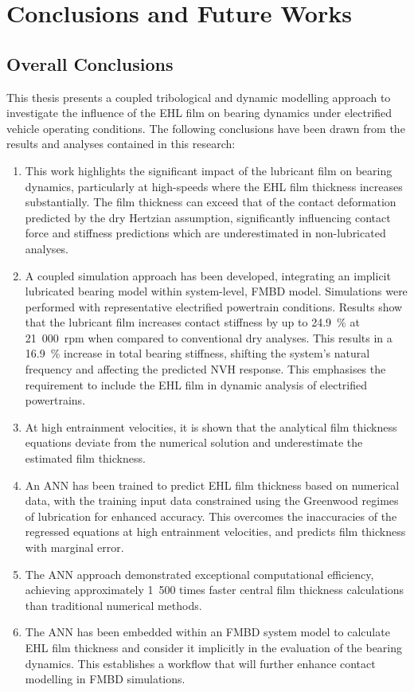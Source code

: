 \chapter{Conclusions and Future Works}
\label{Conclusions}

\section{Overall Conclusions}

This thesis presents a coupled tribological and dynamic modelling approach to investigate the influence of the EHL film on bearing dynamics under electrified vehicle operating conditions. The following conclusions have been drawn from the results and analyses contained in this research:

\begin{enumerate}
	\item This work highlights the significant impact of the lubricant film on bearing dynamics, particularly at high-speeds where the EHL film thickness increases substantially. The film thickness can exceed that of the contact deformation predicted by the dry Hertzian assumption, significantly influencing contact force and stiffness predictions which are underestimated in non-lubricated analyses.
	\item A coupled simulation approach has been developed, integrating an implicit lubricated bearing model within system-level, FMBD model. Simulations were performed with representative electrified powertrain conditions. Results show that the lubricant film increases contact stiffness by up to 24.9~\% at 21~000~rpm when compared to conventional dry analyses. This results in a 16.9~\% increase in total bearing stiffness, shifting the system’s natural frequency and affecting the predicted NVH response. This emphasises the requirement to include the EHL film in dynamic analysis of electrified powertrains.
	\item At high entrainment velocities, it is shown that the analytical film thickness equations deviate from the numerical solution and underestimate the estimated film thickness.
	\item An ANN has been trained to predict EHL film thickness based on numerical data, with the training input data constrained using the Greenwood regimes of lubrication for enhanced accuracy. This overcomes the inaccuracies of the regressed equations at high entrainment velocities, and predicts film thickness with marginal error.
	\item The ANN approach demonstrated exceptional computational efficiency, achieving approximately 1~500 times faster central film thickness calculations than traditional numerical methods.
	\item The ANN has been embedded within an FMBD system model to calculate EHL film thickness and consider it implicitly in the evaluation of the bearing dynamics. This establishes a workflow that will further enhance contact modelling in FMBD simulations.
\end{enumerate}


